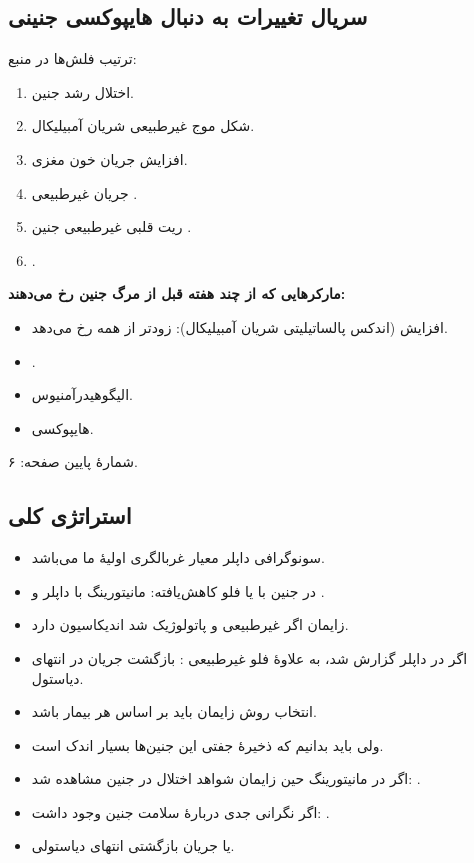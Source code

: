 \documentclass[12pt,a4paper]{article}
\begin{document}
\subsection*{سریال تغییرات به دنبال هایپوکسی جنینی}
ترتیب فلش‌ها در منبع:
\begin{enumerate}
\item اختلال رشد جنین.
\item شکل موج غیرطبیعی شریان آمبیلیکال.
\item افزایش جریان خون مغزی.
\item جریان غیرطبیعی .
\item ریت قلبی غیرطبیعی جنین .
\item {}.
\end{enumerate}

\textbf{مارکرهایی که از چند هفته قبل از مرگ جنین رخ می‌دهند:}
\begin{itemize}
\item افزایش  (اندکس پالساتیلیتی شریان آمبیلیکال): زودتر از همه رخ می‌دهد.
\item {}.
\item الیگوهیدرآمنیوس.
\item هایپوکسی.
\end{itemize}

\FGheader\par
شمارهٔ پایین صفحه: ۶.

\subsection*{استراتژی کلی}
\begin{itemize}
\item سونوگرافی داپلر معیار غربالگری اولیهٔ ما می‌باشد.
\item در جنین با  یا فلو کاهش‌یافته: مانیتورینگ با داپلر و .
\item زایمان اگر  غیرطبیعی و پاتولوژیک شد اندیکاسیون دارد.
\item اگر  در داپلر گزارش شد، به علاوهٔ فلو غیرطبیعی : بازگشت جریان در انتهای دیاستول.
\item انتخاب روش زایمان باید بر اساس هر بیمار باشد.
\item ولی باید بدانیم که ذخیرهٔ جفتی این جنین‌ها بسیار اندک است.
\item اگر در مانیتورینگ حین زایمان شواهد اختلال در جنین مشاهده شد: .
\item اگر نگرانی جدی دربارهٔ سلامت جنین وجود داشت: .
\item {} یا جریان بازگشتی انتهای دیاستولی.
\end{itemize}
\end{document}
